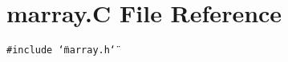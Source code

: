 \section{marray.C File Reference}
\label{marray_8C}
{\tt \#include \char`\"{}marray.h\char`\"{}}\par
